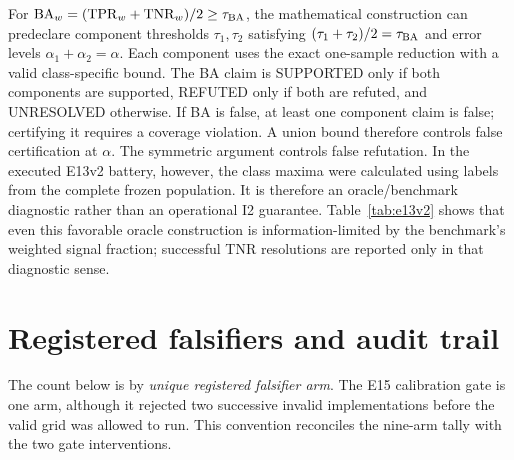 \documentclass[11pt,a4paper]{article}
\begin{document}
For $\mathrm{BA}_w=(\mathrm{TPR}_w+\mathrm{TNR}_w)/2\geq\tau_{\rm BA}$,
the mathematical construction can predeclare component thresholds $\tau_1,\tau_2$ satisfying
$(\tau_1+\tau_2)/2=\tau_{\rm BA}$ and error levels
$\alpha_1+\alpha_2=\alpha$. Each component uses the exact one-sample
reduction with a valid class-specific bound. The BA claim is
SUPPORTED only if both components are supported, REFUTED only if both are
refuted, and UNRESOLVED otherwise. If BA is false, at least one component
claim is false; certifying it requires a coverage violation. A union bound
therefore controls false certification at $\alpha$. The symmetric argument
controls false refutation. In the executed E13v2 battery, however, the class
maxima were calculated using labels from the complete frozen population.
It is therefore an oracle/benchmark diagnostic rather than an operational
I2 guarantee. Table~\ref{tab:e13v2} shows that even this favorable oracle
construction is information-limited by the benchmark's weighted signal
fraction; successful TNR resolutions are reported only in that diagnostic sense.

\section{Registered falsifiers and audit trail}

The count below is by \emph{unique registered falsifier arm}. The E15
calibration gate is one arm, although it rejected two successive invalid
implementations before the valid grid was allowed to run. This convention
reconciles the nine-arm tally with the two gate interventions.
\end{document}
